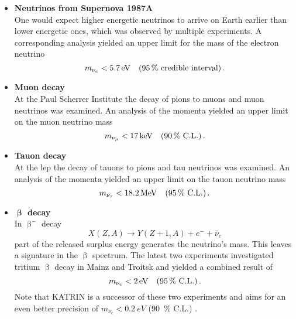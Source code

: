 \begin{itemize}
\renewcommand{\labelitemi}{$\bullet$}
    \item \textbf{Neutrinos from Supernova 1987A}\\ 
    One would expect higher energetic neutrinos to arrive on Earth earlier than lower energetic ones, which was observed by multiple experiments. A corresponding analysis yielded an upper limit for the mass of the electron neutrino \cite{Loredo2002}
    \begin{equation*}
        m_{\nu_e} < \SI{5.7}{eV} \quad (\SI{95}{\percent} \text{ credible interval}) \text{\,.} 
    \end{equation*}
    \item \textbf{Muon decay}\\ 
    At the Paul Scherrer Institute the decay of pions to muons and muon neutrinos was examined. An analysis of the momenta yielded an upper limit on the muon neutrino mass \cite{Assamagan1996}
    \begin{equation*}
        m_{\nu_\mu} < \SI{17}{keV} \quad (\SI{90}{\percent} \text{ C.L.}) \text{\,.} 
    \end{equation*}
    \item \textbf{Tauon decay}\\ 
    At the \gls{lep} the decay of tauons to pions and tau neutrinos was examined. An analysis of the momenta yielded an upper limit on the tauon neutrino mass \cite{Barate:1997zg}
    \begin{equation*}
        m_{\nu_\tau} < \SI{18.2}{MeV} \quad (\SI{95}{\percent} \text{ C.L.}) \text{\,.} 
    \end{equation*}
    \item \textbf{$\boldsymbol{\upbeta}$ decay}\\ 
    In $\upbeta^-$ decay
    \begin{equation}
        X(Z,A) \rightarrow Y(Z+1,A) + e^- + \bar{\nu}_e
    \end{equation}
    part of the released surplus energy generates the neutrino's mass. This leaves a signature in the $\upbeta$ spectrum. The latest two experiments investigated tritium $\upbeta$ decay in Mainz and Troitsk and yielded a combined result of \cite{Kraus2005, Aseev:2011dq, ReviewOfParticlePhysics}
    \begin{equation*}
        m_{\nu_e} < \SI{2}{eV} \quad (\SI{95}{\percent} \text{ C.L.}) \text{\,.} 
    \end{equation*}
    Note that KATRIN is a successor of these two experiments and aims for an even better precision of $m_{\nu_e} < \SI{0.2}{eV}$ (\SI{90}{\percent} C.L.) \cite{Angrik:2005ep}.
\end{itemize}

